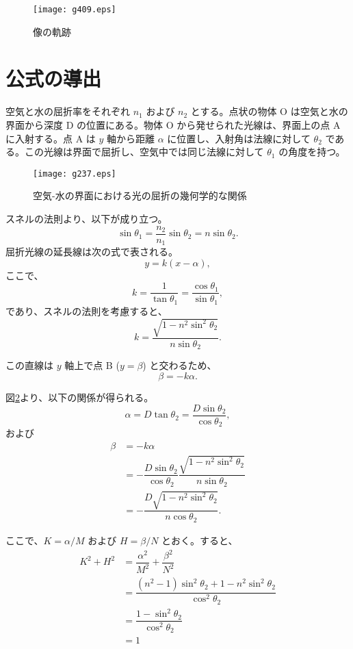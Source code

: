 \documentclass[twocolumn]{article}
\begin{document}
\begin{figure}
	\centering
	\texttt{[image: g409.eps]}
	\caption{像の軌跡}
	\label{fig:squashed_astroid}
\end{figure}

\section{公式の導出}

空気と水の屈折率をそれぞれ $n_1$ および $n_2$ とする。点状の物体 O は空気と水の界面から深度 D の位置にある。物体 O から発せられた光線は、界面上の点 A に入射する。点 A は $y$ 軸から距離 $\alpha$ に位置し、入射角は法線に対して $\theta_2$ である。この光線は界面で屈折し、空気中では同じ法線に対して $\theta_1$ の角度を持つ。

\begin{figure}
	\centering
	\texttt{[image: g237.eps]}
	\caption{空気-水の界面における光の屈折の幾何学的な関係}
	\label{fig:caustic}
\end{figure}

スネルの法則より、以下が成り立つ。
$$ \sin\theta_1 = \frac{n_2}{n_1} \sin\theta_2 = n\sin\theta_2.$$
屈折光線の延長線は次の式で表される。
$$y=k(x-\alpha),$$
ここで、
$$k=\dfrac{1}{\tan\theta_1}=\dfrac{\cos\theta_1}{\sin\theta_1},$$
であり、スネルの法則を考慮すると、
$$k=\dfrac{\sqrt{1-n^2\sin^2\theta_2}}{n\sin\theta_2}.$$

この直線は $y$ 軸上で点 B ($y=\beta$) と交わるため、
$$\beta = -k\alpha.$$

図\ref{fig:caustic}より、以下の関係が得られる。
$$\alpha = D\tan\theta_2 = \dfrac{D\sin\theta_2}{\cos\theta_2},$$
および
$$\begin{aligned}
	\beta &= -k\alpha \\
	&= -\dfrac{D\sin\theta_2}{\cos\theta_2}
	\dfrac{\sqrt{1-n^2\sin^2\theta_2}}{n\sin\theta_2}\\
	&=-\dfrac{D\sqrt{1-n^2\sin^2\theta_2}}{n\cos\theta_2}.
\end{aligned}$$

ここで、$K=\alpha/M$ および $H=\beta/N$ とおく。すると、
$$ \begin{aligned}
	K^2 + H^2 &= \dfrac{\alpha^2}{M^2}+\dfrac{\beta^2}{N^2}\\
	&=\dfrac{\left(n^2-1\right)\sin^2\theta_2 + 1-n^2\sin^2\theta_2}
	{\cos^2\theta_2}\\
	&=\dfrac{1-\sin^2\theta_2}{\cos^2\theta_2}\\
	&=1
\end{aligned}$$
\end{document}

